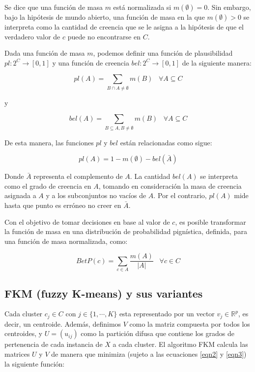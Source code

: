 Se dice que una función de masa $m$ está normalizada si $m(\emptyset) = 0$. Sin embargo, bajo la hipótesis de mundo abierto, una función de masa en la que $m(\emptyset) > 0$ se interpreta como la cantidad de creencia que se le asigna a la hipótesis de que el verdadero valor de $c$ puede no encontrarse en $C$.

Dada una función de masa $m$, podemos definir una función de plausibilidad $pl:2^C \rightarrow [0,1]$ y una función de creencia $bel: 2^C \rightarrow [0,1]$ de la siguiente manera:

\begin{equation}
pl(A) = \sum_{B \cap A \neq \emptyset} m(B) \;\;\; \forall A \subseteq C
\label{eqn4}
\end{equation}

y 

\begin{equation}
bel(A) = \sum_{B \subseteq A, B \neq \emptyset} m(B) \;\;\; \forall A \subseteq C
\label{eqn5}
\end{equation}

De esta manera, las funciones $pl$ y $bel$ están relacionadas como sigue:

\begin{equation}
pl(A) = 1 - m(\emptyset) - bel(\bar{A})
\label{eqn6}
\end{equation}

Donde $\bar{A}$ representa el complemento de $A$.  La cantidad $bel(A)$ se interpreta como el grado de creencia en $A$, tomando en consideración la masa de creencia asignada a $A$ y a los subconjuntos no vacíos de $A$. Por el contrario, $pl(A)$ mide hasta que punto es erróneo no creer en $\bar{A}$.

Con el objetivo de tomar decisiones en base al valor de $c$, es posible transformar la función de masa en una distribución de probabilidad pignística, definida, para una función de masa normalizada, como:

\begin{equation}
BetP(c) = \sum_{c \in A} \frac{m(A)}{|A|} \;\;\; \forall c \in C
\label{eqn7}
\end{equation}

\subsection{FKM (fuzzy K-means) y sus variantes}

Cada cluster $c_j \in C$ con $j \in \{1,\cdots,K\}$ esta representado por un vector $v_j \in \mathbb{R}^p$, es decir, un centroide. Además, definimos $V$ como la matriz compuesta por todos los centroides, y $U = (u_{ij})$ como la partición difusa que contiene los grados de pertenencia de cada instancia de $X$ a cada cluster. El algoritmo \acf{FKM} calcula las matrices $U$ y $V$ de manera que minimiza (sujeto a las ecuaciones \ref{eqn2} y \ref{eqn3}) la siguiente función:

